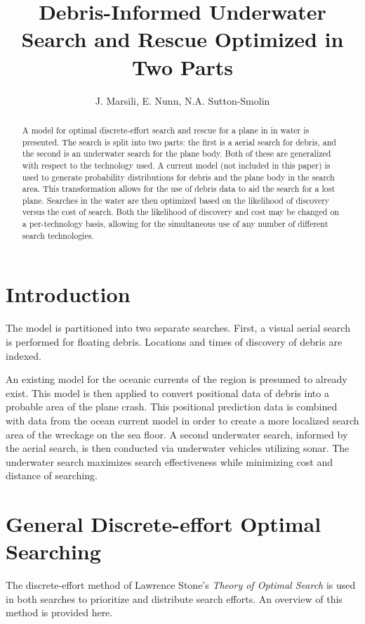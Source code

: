 \documentclass[a4paper]{article}
\title{Debris-Informed Underwater Search and Rescue Optimized in Two Parts}
\author{J. Marsili, E. Nunn, N.A. Sutton-Smolin}
\date{}
\begin{document}
\maketitle

\begin{abstract}
A model for optimal discrete-effort search and rescue for a plane in in water is presented. The search is split into two parts: the first is a aerial search for debris, and the second is an underwater search for the plane body. Both of these are generalized with respect to the technology used. A current model (not included in this paper) is used to generate probability distributions for debris and the plane body in the search area. This transformation allows for the use of debris data to aid the search for a lost plane. Searches in the water are then optimized based on the likelihood of discovery versus the cost of search. Both the likelihood of discovery and cost may be changed on a per-technology basis, allowing for the simultaneous use of any number of different search technologies.  
\end{abstract}

\pagebreak 

\section{Introduction}

The model is partitioned into two separate searches. First, a visual aerial search is performed for floating debris. Locations and times of discovery of debris are indexed. 

An existing model for the oceanic currents of the region is presumed to already exist. This model is then applied to convert positional data of debris into a probable area of the plane crash.  This positional prediction data is combined with data from the ocean current model in order to create a more localized search area of the wreckage on the sea floor. A second underwater search, informed by the aerial search, is then conducted via underwater vehicles utilizing sonar. The underwater search maximizes search effectiveness while minimizing cost and distance of searching. 

\section{General Discrete-effort Optimal Searching}

The discrete-effort method of Lawrence Stone's \textit{Theory of Optimal Search} is used in both searches to prioritize and distribute search efforts. An overview of this method is provided here. 
\end{document}
